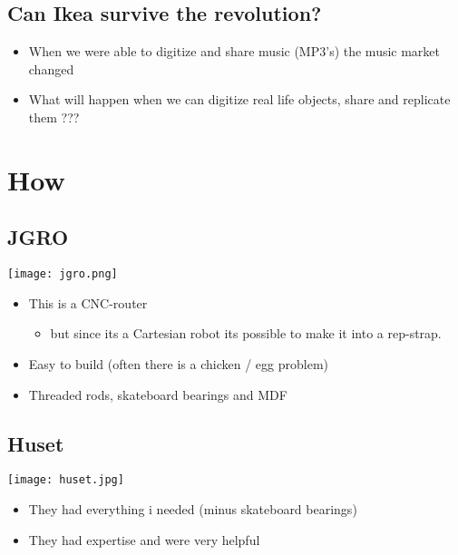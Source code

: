 \documentclass[11pt]{beamer}
\begin{document}
\subsection*{Can Ikea survive the revolution?}\begin{frame}[fragile]
\label{sec-2.4}

\begin{itemize}
\item When we were able to digitize and share music (MP3's) the music
     market changed
\item What will happen when we can digitize real life objects, share
     and replicate them ???
\end{itemize}
\end{frame}
\section{How}
\label{sec-3}


\subsection*{JGRO}\begin{frame}[fragile]
\label{sec-3.1}

\texttt{[image: jgro.png]}
\begin{itemize}
\item This is a CNC-router

\begin{itemize}
\item but since its a Cartesian robot its possible to make it into a
      rep-strap.
\end{itemize}

\item Easy to build (often there is a chicken / egg problem)
\item Threaded rods, skateboard bearings and MDF
\end{itemize}
\end{frame}
\subsection*{Huset}\begin{frame}[fragile]
\label{sec-3.2}

\texttt{[image: huset.jpg]}
\begin{itemize}
\item They had everything i needed (minus skateboard bearings)
\item They had expertise and were very helpful
\end{itemize}
\end{frame}
\end{document}
